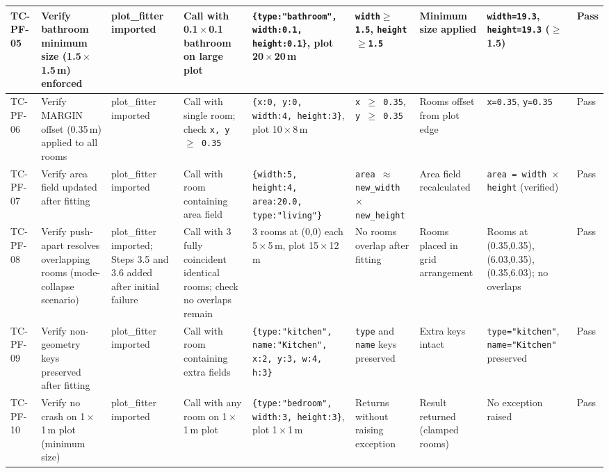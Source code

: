 \begin{landscape}
\begin{longtable}{|p{1.4cm}|p{3.2cm}|p{2.8cm}|p{2.8cm}|p{2.8cm}|p{2.8cm}|p{2.6cm}|p{2.8cm}|p{1.0cm}|}
\rowcolor{passgreen}
TC-PF-05 & Verify bathroom minimum size (1.5\,$\times$\,1.5\,m) enforced & plot\_fitter imported & Call with 0.1\,$\times$\,0.1 bathroom on large plot & \texttt{\{type:"bathroom", width:0.1, height:0.1\}}, plot 20\,$\times$\,20\,m & \texttt{width$\geq$1.5}, \texttt{height$\geq$1.5} & Minimum size applied & \texttt{width=19.3}, \texttt{height=19.3} ($\geq$1.5) & Pass \\ \hline

\rowcolor{passgreen}
TC-PF-06 & Verify MARGIN offset (0.35\,m) applied to all rooms & plot\_fitter imported & Call with single room; check \texttt{x, y $\geq$ 0.35} & \texttt{\{x:0, y:0, width:4, height:3\}}, plot 10\,$\times$\,8\,m & \texttt{x $\geq$ 0.35}, \texttt{y $\geq$ 0.35} & Rooms offset from plot edge & \texttt{x=0.35}, \texttt{y=0.35} & Pass \\ \hline

\rowcolor{passgreen}
TC-PF-07 & Verify area field updated after fitting & plot\_fitter imported & Call with room containing area field & \texttt{\{width:5, height:4, area:20.0, type:"living"\}} & \texttt{area $\approx$ new\_width $\times$ new\_height} & Area field recalculated & \texttt{area = width $\times$ height} (verified) & Pass \\ \hline

\rowcolor{passgreen}
TC-PF-08 & Verify push-apart resolves overlapping rooms (mode-collapse scenario) & plot\_fitter imported; Steps 3.5 and 3.6 added after initial failure & Call with 3 fully coincident identical rooms; check no overlaps remain & 3 rooms at (0,0) each 5\,$\times$\,5\,m, plot 15\,$\times$\,12\,m & No rooms overlap after fitting & Rooms placed in grid arrangement & Rooms at (0.35,0.35), (6.03,0.35), (0.35,6.03); no overlaps & Pass \\ \hline

\rowcolor{passgreen}
TC-PF-09 & Verify non-geometry keys preserved after fitting & plot\_fitter imported & Call with room containing extra fields & \texttt{\{type:"kitchen", name:"Kitchen", x:2, y:3, w:4, h:3\}} & \texttt{type} and \texttt{name} keys preserved & Extra keys intact & \texttt{type="kitchen"}, \texttt{name="Kitchen"} preserved & Pass \\ \hline

\rowcolor{passgreen}
TC-PF-10 & Verify no crash on 1\,$\times$\,1\,m plot (minimum size) & plot\_fitter imported & Call with any room on 1\,$\times$\,1\,m plot & \texttt{\{type:"bedroom", width:3, height:3\}}, plot 1\,$\times$\,1\,m & Returns without raising exception & Result returned (clamped rooms) & No exception raised & Pass \\ \hline

\end{longtable}
\end{landscape}

